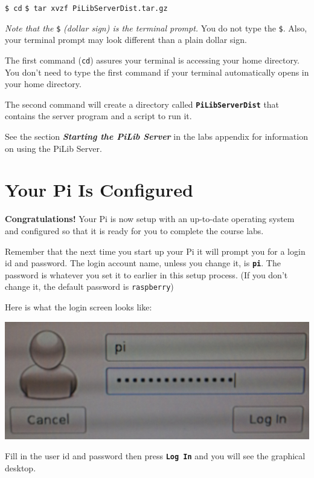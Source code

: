 \texttt{\$ cd} \linebreak
\texttt{\$ tar xvzf PiLibServerDist.tar.gz}

\textit{Note that the} \texttt{\$} \textit{(dollar sign) is the terminal prompt.} You do not type the \texttt{\$}. Also, your terminal prompt may look different than a plain dollar sign.

The first command (\texttt{cd}) assures your terminal is accessing your home directory. You don't need to type the first command if your terminal automatically opens in your home directory.

The second command will create a directory called \textbf{\texttt{PiLibServerDist}} that contains the server program and a script to run it.

See the section \textbf{\textit{Starting the PiLib Server}} in the labs appendix for information on using the PiLib Server.

\section{Your Pi Is Configured}

\textbf{Congratulations!} Your Pi is now setup with an up-to-date operating system and configured so that it is ready for you to complete the course labs.


Remember that the next time you start up your Pi it will prompt you for a login id and password. The login account name, unless you change it, is \textbf{\texttt{pi}}. The password is whatever you set it to earlier in this setup process. (If you don't change it, the default password is \texttt{raspberry})

Here is what the login screen looks like:

\beforefig
\centerline{\includegraphics[height=1.0 in]{pi_images/setup/login_screen.jpg}}
\afterfig

Fill in the user id and password then press \textbf{\texttt{Log In}} and you will see the graphical desktop.